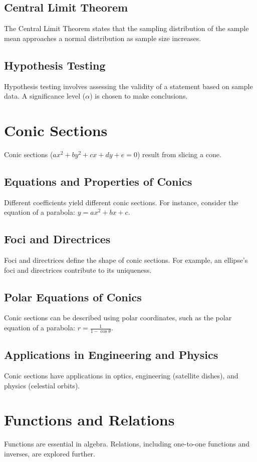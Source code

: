 \documentclass{article}
\begin{document}
\subsection{Central Limit Theorem}
The Central Limit Theorem states that the sampling distribution of the sample mean approaches a normal distribution as sample size increases.

\subsection{Hypothesis Testing}
Hypothesis testing involves assessing the validity of a statement based on sample data. A significance level (\(\alpha\)) is chosen to make conclusions.

\section{Conic Sections}
Conic sections (\(ax^2 + by^2 + cx + dy + e = 0\)) result from slicing a cone.

\subsection{Equations and Properties of Conics}
Different coefficients yield different conic sections. For instance, consider the equation of a parabola: \(y = ax^2 + bx + c\).

\subsection{Foci and Directrices}
Foci and directrices define the shape of conic sections. For example, an ellipse's foci and directrices contribute to its uniqueness.

\subsection{Polar Equations of Conics}
Conic sections can be described using polar coordinates, such as the polar equation of a parabola: \(r = \frac{1}{1 - \cos \theta}\).

\subsection{Applications in Engineering and Physics}
Conic sections have applications in optics, engineering (satellite dishes), and physics (celestial orbits).

\section{Functions and Relations}
Functions are essential in algebra. Relations, including one-to-one functions and inverses, are explored further.
\end{document}

